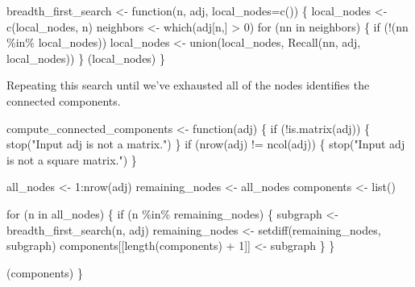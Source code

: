 \documentclass[
  letterpaper,
  DIV=11,
  numbers=noendperiod]{scrartcl}
\newenvironment{Shaded}{\begin{snugshade}}{\end{snugshade}}
\newcommand{\AttributeTok}[1]{\textcolor[rgb]{0.40,0.45,0.13}{#1}}
\newcommand{\ControlFlowTok}[1]{\textcolor[rgb]{0.00,0.23,0.31}{#1}}
\newcommand{\DecValTok}[1]{\textcolor[rgb]{0.68,0.00,0.00}{#1}}
\newcommand{\FunctionTok}[1]{\textcolor[rgb]{0.28,0.35,0.67}{#1}}
\newcommand{\NormalTok}[1]{\textcolor[rgb]{0.00,0.23,0.31}{#1}}
\newcommand{\OtherTok}[1]{\textcolor[rgb]{0.00,0.23,0.31}{#1}}
\newcommand{\SpecialCharTok}[1]{\textcolor[rgb]{0.37,0.37,0.37}{#1}}
\newcommand{\StringTok}[1]{\textcolor[rgb]{0.13,0.47,0.30}{#1}}
\begin{document}
\begin{Shaded}
\begin{Highlighting}[]
\NormalTok{breadth\_first\_search }\OtherTok{\textless{}{-}} \ControlFlowTok{function}\NormalTok{(n, adj, }\AttributeTok{local\_nodes=}\FunctionTok{c}\NormalTok{()) \{}
\NormalTok{  local\_nodes }\OtherTok{\textless{}{-}} \FunctionTok{c}\NormalTok{(local\_nodes, n)}
\NormalTok{  neighbors }\OtherTok{\textless{}{-}} \FunctionTok{which}\NormalTok{(adj[n,] }\SpecialCharTok{\textgreater{}} \DecValTok{0}\NormalTok{)}
  \ControlFlowTok{for}\NormalTok{ (nn }\ControlFlowTok{in}\NormalTok{ neighbors) \{}
    \ControlFlowTok{if}\NormalTok{ (}\SpecialCharTok{!}\NormalTok{(nn }\SpecialCharTok{\%in\%}\NormalTok{ local\_nodes))}
\NormalTok{      local\_nodes }\OtherTok{\textless{}{-}} \FunctionTok{union}\NormalTok{(local\_nodes,}
                           \FunctionTok{Recall}\NormalTok{(nn, adj, local\_nodes))}
\NormalTok{  \}}
\NormalTok{  (local\_nodes)}
\NormalTok{\}}
\end{Highlighting}
\end{Shaded}

Repeating this search until we've exhausted all of the nodes identifies
the connected components.

\begin{Shaded}
\begin{Highlighting}[]
\NormalTok{compute\_connected\_components }\OtherTok{\textless{}{-}} \ControlFlowTok{function}\NormalTok{(adj) \{}
  \ControlFlowTok{if}\NormalTok{ (}\SpecialCharTok{!}\FunctionTok{is.matrix}\NormalTok{(adj)) \{}
    \FunctionTok{stop}\NormalTok{(}\StringTok{"Input adj is not a matrix."}\NormalTok{)}
\NormalTok{  \}}
  \ControlFlowTok{if}\NormalTok{ (}\FunctionTok{nrow}\NormalTok{(adj) }\SpecialCharTok{!=} \FunctionTok{ncol}\NormalTok{(adj)) \{}
    \FunctionTok{stop}\NormalTok{(}\StringTok{"Input adj is not a square matrix."}\NormalTok{)}
\NormalTok{  \}}

\NormalTok{  all\_nodes }\OtherTok{\textless{}{-}} \DecValTok{1}\SpecialCharTok{:}\FunctionTok{nrow}\NormalTok{(adj)}
\NormalTok{  remaining\_nodes }\OtherTok{\textless{}{-}}\NormalTok{ all\_nodes}
\NormalTok{  components }\OtherTok{\textless{}{-}} \FunctionTok{list}\NormalTok{()}

  \ControlFlowTok{for}\NormalTok{ (n }\ControlFlowTok{in}\NormalTok{ all\_nodes) \{}
    \ControlFlowTok{if}\NormalTok{ (n }\SpecialCharTok{\%in\%}\NormalTok{ remaining\_nodes) \{}
\NormalTok{      subgraph }\OtherTok{\textless{}{-}} \FunctionTok{breadth\_first\_search}\NormalTok{(n, adj)}
\NormalTok{      remaining\_nodes }\OtherTok{\textless{}{-}} \FunctionTok{setdiff}\NormalTok{(remaining\_nodes, subgraph)}
\NormalTok{      components[[}\FunctionTok{length}\NormalTok{(components) }\SpecialCharTok{+} \DecValTok{1}\NormalTok{]] }\OtherTok{\textless{}{-}}\NormalTok{ subgraph}
\NormalTok{    \}}
\NormalTok{  \}}

\NormalTok{  (components)}
\NormalTok{\}}
\end{Highlighting}
\end{Shaded}
\end{document}
